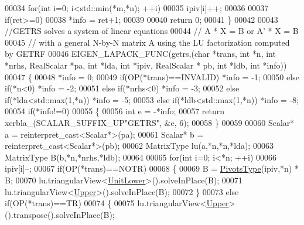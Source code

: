\begin{DoxyCode}
00034   \textcolor{keywordflow}{for}(\textcolor{keywordtype}{int} i=0; i<std::min(*m,*n); ++i)
00035     ipiv[i]++;
00036 
00037   \textcolor{keywordflow}{if}(ret>=0)
00038     *info = ret+1;
00039 
00040   \textcolor{keywordflow}{return} 0;
00041 \}
00042 
00043 \textcolor{comment}{//GETRS solves a system of linear equations}
00044 \textcolor{comment}{//    A * X = B  or  A' * X = B}
00045 \textcolor{comment}{//  with a general N-by-N matrix A using the LU factorization computed  by GETRF}
00046 EIGEN\_LAPACK\_FUNC(getrs,(\textcolor{keywordtype}{char} *trans, \textcolor{keywordtype}{int} *n, \textcolor{keywordtype}{int} *nrhs, RealScalar *pa, \textcolor{keywordtype}{int} *lda, \textcolor{keywordtype}{int} *ipiv, RealScalar *
      pb, \textcolor{keywordtype}{int} *ldb, \textcolor{keywordtype}{int} *info))
00047 \{
00048   *info = 0;
00049         \textcolor{keywordflow}{if}(OP(*trans)==INVALID)  *info = -1;
00050   \textcolor{keywordflow}{else}  \textcolor{keywordflow}{if}(*n<0)                 *info = -2;
00051   \textcolor{keywordflow}{else}  \textcolor{keywordflow}{if}(*nrhs<0)              *info = -3;
00052   \textcolor{keywordflow}{else}  \textcolor{keywordflow}{if}(*lda<std::max(1,*n))  *info = -5;
00053   \textcolor{keywordflow}{else}  \textcolor{keywordflow}{if}(*ldb<std::max(1,*n))  *info = -8;
00054   \textcolor{keywordflow}{if}(*info!=0)
00055   \{
00056     \textcolor{keywordtype}{int} e = -*info;
00057     \textcolor{keywordflow}{return} xerbla\_(SCALAR\_SUFFIX\_UP\textcolor{stringliteral}{"GETRS"}, &e, 6);
00058   \}
00059 
00060   Scalar* a = \textcolor{keyword}{reinterpret\_cast<}Scalar*\textcolor{keyword}{>}(pa);
00061   Scalar* b = \textcolor{keyword}{reinterpret\_cast<}Scalar*\textcolor{keyword}{>}(pb);
00062   MatrixType lu(a,*n,*n,*lda);
00063   MatrixType B(b,*n,*nrhs,*ldb);
00064 
00065   \textcolor{keywordflow}{for}(\textcolor{keywordtype}{int} i=0; i<*n; ++i)
00066     ipiv[i]--;
00067   \textcolor{keywordflow}{if}(OP(*trans)==NOTR)
00068   \{
00069     B = \hyperlink{group___core___module_class_eigen_1_1_map}{PivotsType}(ipiv,*n) * B;
00070     lu.triangularView<\hyperlink{group__enums_gga39e3366ff5554d731e7dc8bb642f83cda8155cfdfde9e75e7144dff0393d17181}{UnitLower}>().solveInPlace(B);
00071     lu.triangularView<\hyperlink{group__enums_gga39e3366ff5554d731e7dc8bb642f83cda6bcb58be3b8b8ec84859ce0c5ac0aaec}{Upper}>().solveInPlace(B);
00072   \}
00073   \textcolor{keywordflow}{else} \textcolor{keywordflow}{if}(OP(*trans)==TR)
00074   \{
00075     lu.triangularView<\hyperlink{group__enums_gga39e3366ff5554d731e7dc8bb642f83cda6bcb58be3b8b8ec84859ce0c5ac0aaec}{Upper}>().transpose().solveInPlace(B);

\end{DoxyCode}
